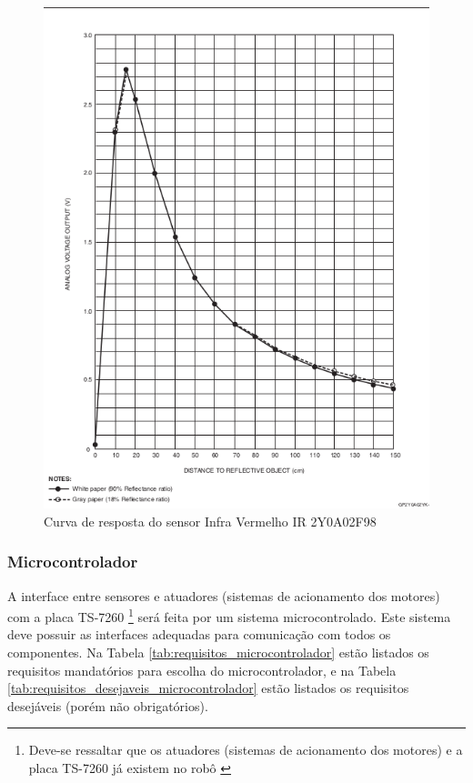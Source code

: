 \begin{figure}[H]
\centering
\includegraphics[width=1\textwidth]{./figuras/ir-sensor-response.png}
\caption{Curva de resposta do sensor Infra Vermelho IR 2Y0A02F98}
\label{fig:ir_sensor_response}
\end{figure}

\subsubsection{Microcontrolador}

A interface entre sensores e atuadores (sistemas de acionamento dos motores) com a placa TS-7260 \footnote{Deve-se ressaltar que os atuadores (sistemas de acionamento dos motores) e a placa TS-7260 já existem no robô \cite{bellator_2012}} será feita por um sistema microcontrolado. Este sistema deve possuir as interfaces adequadas para comunicação com todos os componentes. Na Tabela \ref{tab:requisitos_microcontrolador} estão listados os requisitos mandatórios para escolha do microcontrolador, e na Tabela \ref{tab:requisitos_desejaveis_microcontrolador} estão listados os requisitos desejáveis (porém não obrigatórios).

